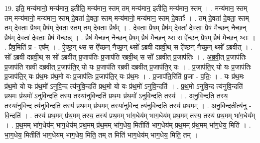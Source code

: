 \documentclass[17pt]{extarticle}
\begin{document}
19. इति॒ मन्य॑मानो॒ मन्य॑मान॒ इतीति॒ मन्य॑मान॒ स्तम् तम् मन्य॑मान॒ इतीति॒ मन्य॑मान॒ स्तम् । . मन्य॑मान॒ स्तम् तम् मन्य॑मानो॒ मन्य॑मान॒ स्तम् दे॒वता॑ दे॒वता॒ स्तम् मन्य॑मानो॒ मन्य॑मान॒ स्तम् दे॒वताः᳚ । . तम् दे॒वता॑ दे॒वता॒ स्तम् तम् दे॒वताः॒ प्रैष॒म् प्रैष॑म् दे॒वता॒ स्तम् तम् दे॒वताः॒ प्रैष᳚म् । . दे॒वताः॒ प्रैष॒म् प्रैष॑म् दे॒वता॑ दे॒वताः॒ प्रैष॑ मैच्छन् नैच्छ॒न् प्रैष॑म् दे॒वता॑ दे॒वताः॒ प्रैष॑ मैच्छन्न् । . प्रैष॑ मैच्छन् नैच्छ॒न् प्रैष॒म् प्रैष॑ मैच्छ॒न् थ्स स ऐ᳚च्छ॒न् प्रैष॒म् प्रैष॑ मैच्छ॒न् थ्सः । . प्रैष॒मिति॑ प्र - एष᳚म् । . ऐ॒च्छ॒न् थ्स स ऐ᳚च्छन् नैच्छ॒न् थ्सो᳚ ऽब्रवी दब्रवी॒थ् स ऐ᳚च्छन् नैच्छ॒न् थ्सो᳚ ऽब्रवीत् । . सो᳚ ऽब्रवी दब्रवी॒थ् स सो᳚ ऽब्रवीत् प्र॒जाप॑तिः प्र॒जाप॑ति रब्रवी॒थ् स सो᳚ ऽब्रवीत् प्र॒जाप॑तिः । . अ॒ब्र॒वी॒त् प्र॒जाप॑तिः प्र॒जाप॑ति रब्रवी दब्रवीत् प्र॒जाप॑ति॒र् यो यः प्र॒जाप॑ति रब्रवी दब्रवीत् प्र॒जाप॑ति॒र् यः । . प्र॒जाप॑ति॒र् यो यः प्र॒जाप॑तिः प्र॒जाप॑ति॒र् यः प्र॑थ॒मः प्र॑थ॒मो यः प्र॒जाप॑तिः प्र॒जाप॑ति॒र् यः प्र॑थ॒मः । . प्र॒जाप॑ति॒रिति॑ प्र॒जा - प॒तिः॒ । . यः प्र॑थ॒मः प्र॑थ॒मो यो यः प्र॑थ॒मो॑ ऽनुवि॒न्द त्य॑नुवि॒न्दति॑ प्रथ॒मो यो यः प्र॑थ॒मो॑ ऽनुवि॒न्दति॑ । . प्र॒थ॒मो॑ ऽनुवि॒न्द त्य॑नुवि॒न्दति॑ प्रथ॒मः प्र॑थ॒मो॑ ऽनुवि॒न्दति॒ तस्य॒ तस्या॑नुवि॒न्दति॑ प्रथ॒मः प्र॑थ॒मो॑ ऽनुवि॒न्दति॒ तस्य॑ । . अ॒नु॒वि॒न्दति॒ तस्य॒ तस्या॑नुवि॒न्द त्य॑नुवि॒न्दति॒ तस्य॑ प्रथ॒मम् प्र॑थ॒मम् तस्या॑नुवि॒न्द त्य॑नुवि॒न्दति॒ तस्य॑ प्रथ॒मम् । . अ॒नु॒वि॒न्दतीत्य॑नु - वि॒न्दति॑ । . तस्य॑ प्रथ॒मम् प्र॑थ॒मम् तस्य॒ तस्य॑ प्रथ॒मम् भा॑ग॒धेय॑म् भाग॒धेय॑म् प्रथ॒मम् तस्य॒ तस्य॑ प्रथ॒मम् भा॑ग॒धेय᳚म् । . प्र॒थ॒मम् भा॑ग॒धेय॑म् भाग॒धेय॑म् प्रथ॒मम् प्र॑थ॒मम् भा॑ग॒धेय॒ मितीति॑ भाग॒धेय॑म् प्रथ॒मम् प्र॑थ॒मम् भा॑ग॒धेय॒ मिति॑ । . भा॒ग॒धेय॒ मितीति॑ भाग॒धेय॑म् भाग॒धेय॒ मिति॒ तम् त मिति॑ भाग॒धेय॑म् भाग॒धेय॒ मिति॒ तम् । \newline
\end{document}
